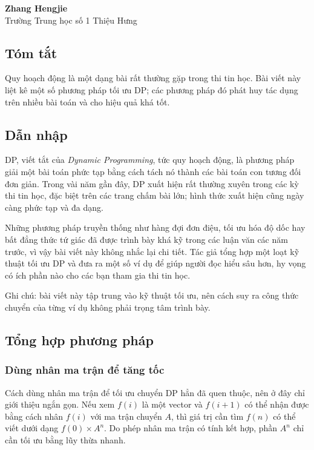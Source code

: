 \documentclass[11pt]{article}
\begin{document}
\begin{center}
\textbf{Zhang Hengjie}\\
Trường Trung học số 1 Thiệu Hưng
\end{center}

\subsection*{Tóm tắt}

Quy hoạch động là một dạng bài rất thường gặp trong thi tin học. Bài viết này
liệt kê một số phương pháp tối ưu DP; các phương pháp đó phát huy tác dụng trên
nhiều bài toán và cho hiệu quả khá tốt.

\subsection{Dẫn nhập}

DP, viết tắt của \emph{Dynamic Programming}, tức quy hoạch động, là phương pháp
giải một bài toán phức tạp bằng cách tách nó thành các bài toán con tương đối
đơn giản. Trong vài năm gần đây, DP xuất hiện rất thường xuyên trong các kỳ thi
tin học, đặc biệt trên các trang chấm bài lớn; hình thức xuất hiện cũng ngày
càng phức tạp và đa dạng.

Những phương pháp truyền thống như hàng đợi đơn điệu, tối ưu hóa độ dốc hay bất
đẳng thức tứ giác đã được trình bày khá kỹ trong các luận văn các năm trước, vì
vậy bài viết này không nhắc lại chi tiết. Tác giả tổng hợp một loạt kỹ thuật tối
ưu DP và đưa ra một số ví dụ để giúp người đọc hiểu sâu hơn, hy vọng có ích phần
nào cho các bạn tham gia thi tin học.

Ghi chú: bài viết này tập trung vào kỹ thuật tối ưu, nên cách suy ra công thức
chuyển của từng ví dụ không phải trọng tâm trình bày.

\subsection{Tổng hợp phương pháp}

\subsubsection{Dùng nhân ma trận để tăng tốc}

Cách dùng nhân ma trận để tối ưu chuyển DP hẳn đã quen thuộc, nên ở đây chỉ giới
thiệu ngắn gọn. Nếu xem \(f(i)\) là một vector và \(f(i+1)\) có thể nhận được
bằng cách nhân \(f(i)\) với ma trận chuyển \(A\), thì giá trị cần tìm \(f(n)\)
có thể viết dưới dạng \(f(0)\times A^n\). Do phép nhân ma trận có tính kết hợp,
phần \(A^n\) chỉ cần tối ưu bằng lũy thừa nhanh.
\end{document}
